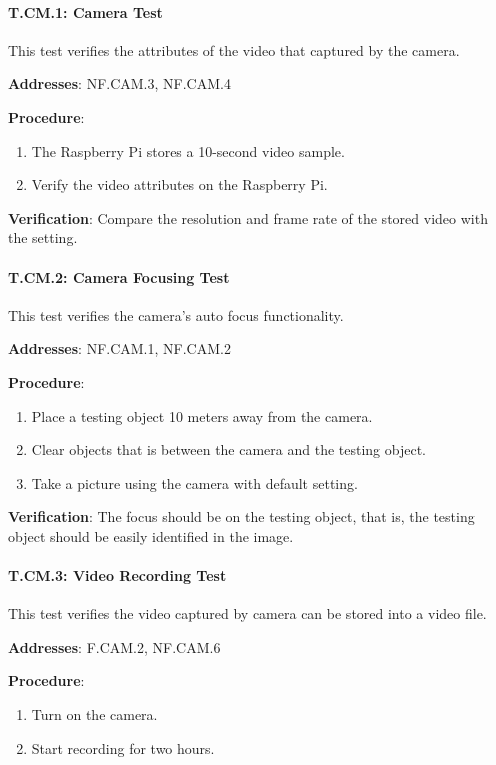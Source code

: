 \paragraph{T.CM.1: Camera Test}

This test verifies the attributes of the video that captured by the camera.

\textbf{Addresses}: NF.CAM.3, NF.CAM.4

\textbf{Procedure}:
\begin{enumerate}[noitemsep]
    \item The Raspberry Pi stores a 10-second video sample.
    \item Verify the video attributes on the Raspberry Pi.
\end{enumerate}

\textbf{Verification}: 
Compare the resolution and frame rate of the stored video with the setting.

%

\paragraph{T.CM.2: Camera Focusing Test}

This test verifies the camera's auto focus functionality.

\textbf{Addresses}: NF.CAM.1, NF.CAM.2

\textbf{Procedure}:
\begin{enumerate}[noitemsep]
    \item Place a testing object 10 meters away from the camera.
    \item Clear objects that is between the camera and the testing object.
    \item Take a picture using the camera with default setting.
\end{enumerate}

\textbf{Verification}: 
The focus should be on the testing object, that is, the testing object should be easily identified in the image.

%

\paragraph{T.CM.3: Video Recording Test}

This test verifies the video captured by camera can be stored into a video file.

\textbf{Addresses}: F.CAM.2, NF.CAM.6

\textbf{Procedure}:
\begin{enumerate}[noitemsep]
    \item Turn on the camera.
    \item Start recording for two hours.
\end{enumerate}

